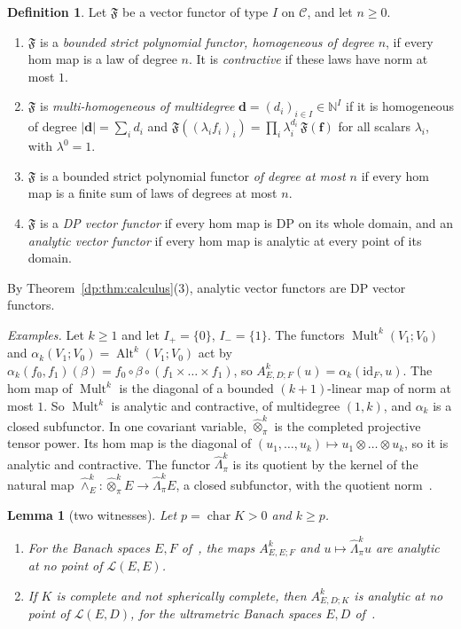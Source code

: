 \documentclass[11pt]{amsart}
\newtheorem{lemma}[theorem]{Lemma}
\theoremstyle{definition}
\newtheorem{definition}[theorem]{Definition}
\theoremstyle{remark}
\numberwithin{equation}{section}
\newcommand{\N}{\mathbb N}
\newcommand{\cL}{\mathcal L}
\newcommand{\Alt}{\operatorname{Alt}}
\newcommand{\Mult}{\operatorname{Mult}}
\newcommand{\id}{\mathrm{id}}
\newcommand{\abs}[1]{\lvert #1\rvert}
\newcommand{\cC}{\mathcal{C}}
\theoremstyle{plain}
\theoremstyle{definition}
\theoremstyle{plain}
\newcommand{\hot}{\mathbin{\widehat\otimes}}
\newcommand{\hLambda}{\widehat\Lambda}
\begin{document}
\begin{definition}\label{dp:def:poly-functor}
Let $\mathfrak F$ be a vector functor of type $I$ on $\cC$, and let $n\ge0$.
\begin{enumerate}
\item $\mathfrak F$ is a \emph{bounded strict polynomial functor, homogeneous of degree $n$}, if every hom map is a law of degree $n$. It is \emph{contractive} if these laws have norm at most $1$.
\item $\mathfrak F$ is \emph{multi-homogeneous of multidegree} $\mathbf d=(d_i)_{i\in I}\in\N^I$ if it is homogeneous of degree $\abs{\mathbf d}=\sum_id_i$ and $\mathfrak F((\lambda_if_i)_i)=\prod_i\lambda_i^{d_i}\,\mathfrak F(\mathbf f)$ for all scalars $\lambda_i$, with $\lambda^0=1$.
\item $\mathfrak F$ is a bounded strict polynomial functor \emph{of degree at most $n$} if every hom map is a finite sum of laws of degrees at most $n$.
\item $\mathfrak F$ is a \emph{DP vector functor} if every hom map is DP on its whole domain, and an \emph{analytic vector functor} if every hom map is analytic at every point of its domain.
\end{enumerate}
\end{definition}

By Theorem~\ref{dp:thm:calculus}(3), analytic vector functors are DP vector functors.

\emph{Examples.} Let $k\ge1$ and let $I_+=\{0\}$, $I_-=\{1\}$. The functors $\Mult^k(V_1;V_0)$ and $\alpha_k(V_1;V_0)=\Alt^k(V_1;V_0)$ act by $\alpha_k(f_0,f_1)(\beta)=f_0\circ\beta\circ(f_1\times\dots\times f_1)$, so $A^k_{E,D;F}(u)=\alpha_k(\id_F,u)$. The hom map of $\Mult^k$ is the diagonal of a bounded $(k+1)$\nobreakdash-linear map of norm at most $1$. So $\Mult^k$ is analytic and contractive, of multidegree $(1,k)$, and $\alpha_k$ is a closed subfunctor. In one covariant variable, $\hot^k_\pi$ is the completed projective tensor power. Its hom map is the diagonal of $(u_1,\dots,u_k)\mapsto u_1\otimes\dots\otimes u_k$, so it is analytic and contractive. The functor $\hLambda^k_\pi$ is its quotient by the kernel of the natural map $\widehat\wedge^k_E\colon\hot^k_\pi E\to\hLambda^k_\pi E$, a closed subfunctor, with the quotient norm~\cite[Lemma~3.7, Definition~3.8(1)]{I}.

\begin{lemma}[two witnesses]\label{dp:fn:lem:witnesses}
Let $p=\operatorname{char}K>0$ and $k\ge p$.
\begin{enumerate}
\item For the Banach spaces $E,F$ of~\cite[Theorem~7.2(1)]{I}, the maps $A^k_{E,E;F}$ and $u\mapsto\hLambda^k_\pi u$ are analytic at no point of $\cL(E,E)$.
\item If $K$ is complete and not spherically complete, then $A^k_{E,D;K}$ is analytic at no point of $\cL(E,D)$, for the ultrametric Banach spaces $E,D$ of~\cite[Theorem~7.2(2)]{I}.
\end{enumerate}
\end{lemma}
\end{document}
